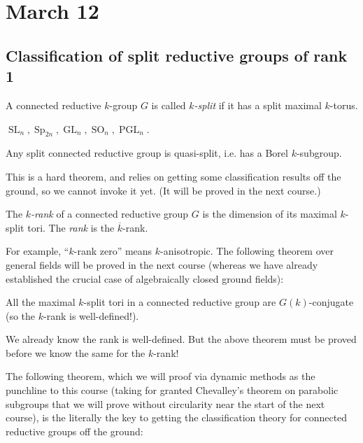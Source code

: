 \documentclass[10pt]{article}
\renewcommand{\(}{\left(}
\renewcommand{\)}{\right)}
\numberwithin{thm}{subsection}
\begin{document}
\section{March 12}
\subsection{Classification of split reductive groups of rank 1}
\begin{defn}\label{}
A connected reductive $k$-group $G$ is called \textit{$k$-split} if it has a split maximal $k$-torus.
\end{defn}
\begin{ex}\label{}
$\operatorname{SL}_n, \operatorname{Sp}_{2n}, \operatorname{GL}_n, \operatorname{SO}_n, \operatorname{PGL}_n$.
\end{ex}
\begin{thm}\label{}
Any split connected reductive group is quasi-split, i.e. has a Borel $k$-subgroup.
\end{thm}
This is a hard theorem, and relies on getting some classification results off the ground, 
so we cannot invoke it yet. (It will be proved in the next course.)
\begin{defn}\label{}
The \textit{$k$-rank} of a connected reductive group $G$
is the dimension of its maximal $k$-split tori.
The \textit{rank} is the $\overline{k}$-rank.
\end{defn}
For example, ``$k$-rank zero'' means $k$-anisotropic.  The following theorem over general fields will be proved in the next course
(whereas we have already established the crucial case of algebraically closed ground fields):
\begin{thm}\label{}
All the maximal $k$-split tori in a connected reductive group are $G(k)$-conjugate
(so the $k$-rank is well-defined!). 
\end{thm}
We already know the rank is well-defined. But the above theorem must be proved before we know the same for the $k$-rank!

The following theorem, which we will proof via dynamic methods as the punchline to this course
(taking for granted Chevalley's theorem on parabolic subgroups that we
will prove without circularity near the start of the next course), 
 is the literally the key to getting the classification theory for connected reductive groups off the ground:
 
\end{document}
